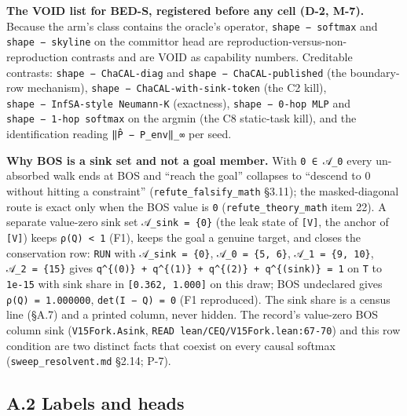 \documentclass[11pt,a4paper]{article}
\theoremstyle{plain}
\theoremstyle{definition}
\theoremstyle{remark}
\begin{document}
\textbf{The VOID list for BED-S, registered before any cell (D-2, M-7).}
Because the arm's class contains the oracle's operator,
\texttt{shape\ −\ softmax} and \texttt{shape\ −\ skyline} on the
committor head are reproduction-versus-non-reproduction contrasts and
are VOID as capability numbers. Creditable contrasts:
\texttt{shape\ −\ ChaCAL-diag} and \texttt{shape\ −\ ChaCAL-published}
(the boundary-row mechanism), \texttt{shape\ −\ ChaCAL-with-sink-token}
(the C2 kill), \texttt{shape\ −\ InfSA-style\ Neumann-K} (exactness),
\texttt{shape\ −\ 0-hop\ MLP} and \texttt{shape\ −\ 1-hop\ softmax} on
the argmin (the C8 static-task kill), and the identification reading
\texttt{‖P̂\ −\ P\_env‖\_∞} per seed.

\textbf{Why BOS is a sink set and not a goal member.} With
\texttt{0\ ∈\ 𝒜\_0} every un-absorbed walk ends at BOS and ``reach the
goal'' collapses to ``descend to 0 without hitting a constraint''
(\texttt{refute\_falsify\_math} §3.11); the masked-diagonal route is
exact only when the BOS value is \texttt{0}
(\texttt{refute\_theory\_math} item 22). A separate value-zero sink set
\texttt{𝒜\_sink\ =\ \{0\}} (the leak state of \citep{roffo-2026-infsa}
\texttt{{[}V{]}}, the anchor of \citep{ranmilo-2026-attentionsinks}
\texttt{{[}V{]}}) keeps \texttt{ρ(Q)\ \textless{}\ 1} (F1), keeps the
goal a genuine target, and closes the conservation row: \texttt{RUN}
with \texttt{𝒜\_sink\ =\ \{0\}}, \texttt{𝒜\_0\ =\ \{5,\ 6\}},
\texttt{𝒜\_1\ =\ \{9,\ 10\}}, \texttt{𝒜\_2\ =\ \{15\}} gives
\texttt{q\^{}\{(0)\}\ +\ q\^{}\{(1)\}\ +\ q\^{}\{(2)\}\ +\ q\^{}\{(sink)\}\ =\ 1}
on \texttt{T} to \texttt{1e-15} with sink share in
\texttt{{[}0.362,\ 1.000{]}} on this draw; BOS undeclared gives
\texttt{ρ(Q)\ =\ 1.000000}, \texttt{det(I\ −\ Q)\ =\ 0} (F1 reproduced).
The sink share is a census line (§A.7) and a printed column, never
hidden. The record's value-zero BOS column sink (\texttt{V15Fork.Asink},
\texttt{READ\ lean/CEQ/V15Fork.lean:67-70}) and this row condition are
two distinct facts that coexist on every causal softmax
(\texttt{sweep\_resolvent.md} §2.14; P-7).

\subsection{A.2 Labels and heads}\label{a.2-labels-and-heads}
\end{document}
